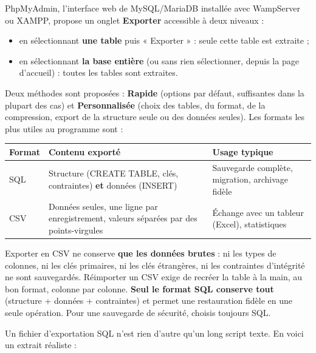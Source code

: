 \documentclass[11pt]{article}
\newcommand{\cle}[1]{{\popxbold\color{popdark}#1}}
\begin{document}
PhpMyAdmin, l'interface web de MySQL/MariaDB installée avec WampServer ou XAMPP, propose un onglet \textbf{Exporter} accessible à deux niveaux :

\begin{itemize}
\item en sélectionnant \textbf{une table} puis « Exporter » : seule cette table est extraite ;
\item en sélectionnant \textbf{la base entière} (ou sans rien sélectionner, depuis la page d'accueil) : toutes les tables sont extraites.
\end{itemize}

Deux méthodes sont proposées : \textbf{Rapide} (options par défaut, suffisantes dans la plupart des cas) et \textbf{Personnalisée} (choix des tables, du format, de la compression, export de la structure seule ou des données seules). Les formats les plus utiles au programme sont :

\begin{center}
\begin{tabularx}{\linewidth}{|l|X|X|}
\hline
\rowcolor{popblueL} \textbf{Format} & \textbf{Contenu exporté} & \textbf{Usage typique} \\
\hline
SQL & Structure (CREATE TABLE, clés, contraintes) \textbf{et} données (INSERT) & Sauvegarde complète, migration, archivage fidèle \\
\hline
CSV & Données seules, une ligne par enregistrement, valeurs séparées par des points-virgules & Échange avec un tableur (Excel), statistiques \\
\hline
\end{tabularx}
\end{center}

\begin{attention}
Exporter en \cle{CSV} ne conserve \textbf{que les données brutes} : ni les types de colonnes, ni les clés primaires, ni les clés étrangères, ni les contraintes d'intégrité ne sont sauvegardés. Réimporter un CSV exige de recréer la table à la main, au bon format, colonne par colonne. \textbf{Seul le format SQL conserve tout} (structure + données + contraintes) et permet une restauration fidèle en une seule opération. Pour une sauvegarde de sécurité, choisis toujours SQL.
\end{attention}

Un fichier d'exportation SQL n'est rien d'autre qu'un long script texte. En voici un extrait réaliste :
\end{document}
